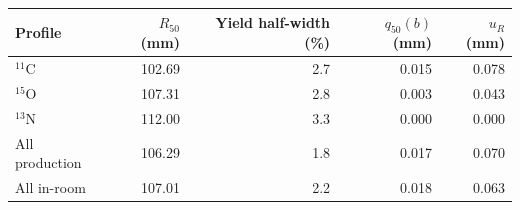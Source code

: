 \begin{tabular}{lrrrr}
\toprule
Profile & $R_{50}$ (mm) & Yield half-width (\%) & $q_{50}(b)$ (mm) & $u_R$ (mm) \\
\midrule
$^{11}$C & 102.69 & 2.7 & 0.015 & 0.078 \\
$^{15}$O & 107.31 & 2.8 & 0.003 & 0.043 \\
$^{13}$N & 112.00 & 3.3 & 0.000 & 0.000 \\
All production & 106.29 & 1.8 & 0.017 & 0.070 \\
All in-room & 107.01 & 2.2 & 0.018 & 0.063 \\
\bottomrule
\end{tabular}
